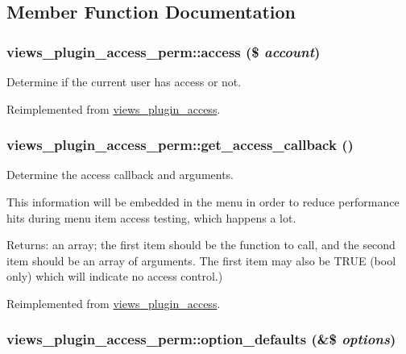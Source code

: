 \subsection{Member Function Documentation}
\hypertarget{classviews__plugin__access__perm_c5b655153815ade74513b1af48c18cad}{
\subsubsection[{access}]{\setlength{\rightskip}{0pt plus 5cm}views\_\-plugin\_\-access\_\-perm::access (\$ {\em account})}}
\label{classviews__plugin__access__perm_c5b655153815ade74513b1af48c18cad}


Determine if the current user has access or not. 

Reimplemented from \hyperlink{classviews__plugin__access_d24d38c1b1a1bd7527b2b96a2103cede}{views\_\-plugin\_\-access}.\hypertarget{classviews__plugin__access__perm_c9dce994826265f48711a23cf3f2414f}{
\subsubsection[{get\_\-access\_\-callback}]{\setlength{\rightskip}{0pt plus 5cm}views\_\-plugin\_\-access\_\-perm::get\_\-access\_\-callback ()}}
\label{classviews__plugin__access__perm_c9dce994826265f48711a23cf3f2414f}


Determine the access callback and arguments.

This information will be embedded in the menu in order to reduce performance hits during menu item access testing, which happens a lot.

\begin{Desc}
\item[Returns:]an array; the first item should be the function to call, and the second item should be an array of arguments. The first item may also be TRUE (bool only) which will indicate no access control.) \end{Desc}


Reimplemented from \hyperlink{classviews__plugin__access_d4038a32fccc6a662a74f437d0bf6a23}{views\_\-plugin\_\-access}.\hypertarget{classviews__plugin__access__perm_5c87d379496d4e48b22f0cfe8353a2e1}{
\subsubsection[{option\_\-defaults}]{\setlength{\rightskip}{0pt plus 5cm}views\_\-plugin\_\-access\_\-perm::option\_\-defaults (\&\$ {\em options})}}
\label{classviews__plugin__access__perm_5c87d379496d4e48b22f0cfe8353a2e1}


